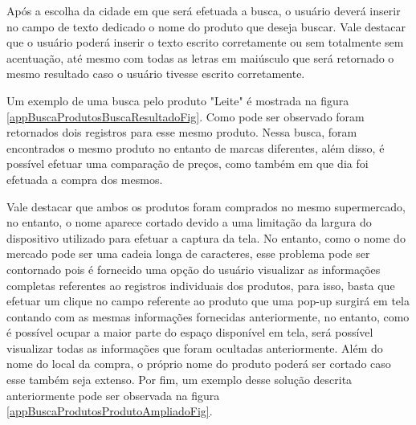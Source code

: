 Após a escolha da cidade em que será efetuada a busca, o usuário deverá inserir no campo de texto dedicado o nome do produto que deseja buscar. Vale destacar que o usuário poderá inserir o texto escrito corretamente ou sem totalmente sem acentuação, até mesmo com todas as letras em maiúsculo que será retornado o mesmo resultado caso o usuário tivesse escrito corretamente.

\newpage
Um exemplo de uma busca pelo produto "Leite" é mostrada na figura \ref{appBuscaProdutosBuscaResultadoFig}. Como pode ser observado foram retornados dois registros para esse mesmo produto. Nessa busca, foram encontrados o mesmo produto no entanto de marcas diferentes, além disso, é possível efetuar uma comparação de preços, como também em que dia foi efetuada a compra dos mesmos.

Vale destacar que ambos os produtos foram comprados no mesmo supermercado, no entanto, o nome aparece cortado devido a uma limitação da largura do dispositivo utilizado para efetuar a captura da tela. No entanto, como o nome do mercado pode ser uma cadeia longa de caracteres, esse problema pode ser contornado pois é fornecido uma opção do usuário visualizar as informações completas referentes ao registros individuais dos produtos, para isso, basta que efetuar um clique no campo referente ao produto que uma pop-up surgirá em tela contando com as mesmas informações fornecidas anteriormente, no entanto, 
como é possível ocupar a maior parte do espaço disponível em tela, será possível visualizar todas as informações que foram ocultadas anteriormente. Além do nome do local da compra, o próprio nome do produto poderá ser cortado caso esse também seja extenso. Por fim, um exemplo desse solução descrita anteriormente pode ser observada na figura \ref{appBuscaProdutosProdutoAmpliadoFig}.

